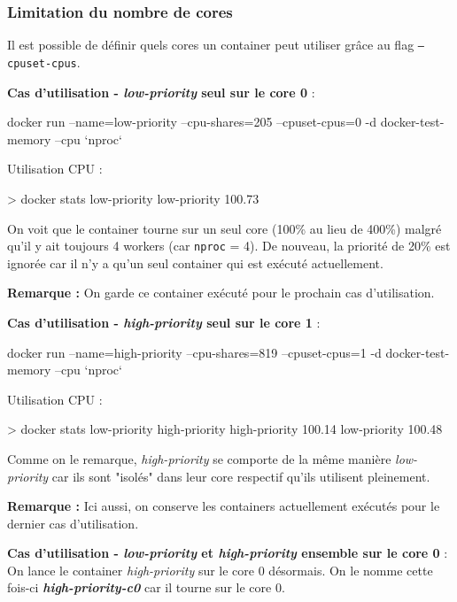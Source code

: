\documentclass[11pt,a4paper,oneside]{report}
\newcommand{\code}[1]{\texttt{#1}}
\begin{document}
\subsubsection{Limitation du nombre de cores}
Il est possible de définir quels cores un container peut utiliser grâce au flag \code{--cpuset-cpus}.

\textbf{Cas d'utilisation - \textit{low-priority} seul sur le core 0} :

\begin{textcode}
docker run --name=low-priority --cpu-shares=205 --cpuset-cpus=0 -d docker-test-memory --cpu `nproc`
\end{textcode}

Utilisation CPU :
\begin{textcode}
> docker stats low-priority
low-priority   100.73%
\end{textcode}

On voit que le container tourne sur un seul core (100\% au lieu de 400\%) malgré qu'il y ait toujours 4 workers (car \code{nproc} = 4). De nouveau, la priorité de 20\% est ignorée car il n'y a qu'un seul container qui est exécuté actuellement.

\textbf{Remarque :} On garde ce container exécuté pour le prochain cas d'utilisation.

\textbf{Cas d'utilisation - \textit{high-priority} seul sur le core 1} :

\begin{textcode}
docker run --name=high-priority --cpu-shares=819 --cpuset-cpus=1 -d docker-test-memory --cpu `nproc`
\end{textcode}

Utilisation CPU :

\begin{textcode}
> docker stats low-priority high-priority 
high-priority   100.14%
low-priority    100.48%
\end{textcode}

Comme on le remarque, \textit{high-priority} se comporte de la même manière \textit{low-priority} car ils sont "isolés" dans leur core respectif qu'ils utilisent pleinement.

\textbf{Remarque :} Ici aussi, on conserve les containers actuellement exécutés pour le dernier cas d'utilisation.

\textbf{Cas d'utilisation - \textit{low-priority} et \textit{high-priority} ensemble sur le core 0} :
On lance le container \textit{high-priority} sur le core 0 désormais. On le nomme cette fois-ci \textbf{\textit{high-priority-c0}} car il tourne sur le core 0.
\end{document}
